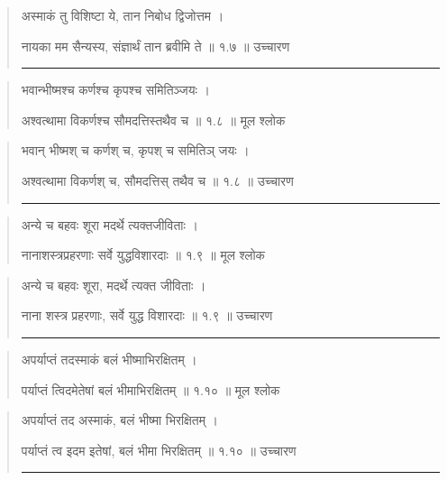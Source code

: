 \begin{quotation}

अस्माकं तु विशिष्टा ये, तान निबोध द्विजोत्तम  ।  

नायका मम सैन्यस्य, संज्ञार्थं तान ब्रवीमि ते  ॥ १.७ ॥  उच्चारण

\noindent\rule{16cm}{0.4pt} 
\end{quotation}


\begin{quotation} 

भवान्भीष्मश्च कर्णश्च कृपश्च समितिञ्जयः  ।  

अश्वत्थामा विकर्णश्च सौमदत्तिस्तथैव च  ॥ १.८ ॥  मूल श्लोक
\end{quotation}

\begin{quotation}

भवान् भीष्मश् च कर्णश् च, कृपश् च समितिञ् जयः ।  

अश्वत्थामा विकर्णश् च, सौमदत्तिस् तथैव च  ॥ १.८ ॥  उच्चारण

\noindent\rule{16cm}{0.4pt} 
\end{quotation}


\begin{quotation} 

अन्ये च बहवः शूरा मदर्थे त्यक्तजीविताः  ।  

नानाशस्त्रप्रहरणाः सर्वे युद्धविशारदाः  ॥ १.९ ॥  मूल श्लोक
\end{quotation}

\begin{quotation}

अन्ये च बहवः शूरा, मदर्थे त्यक्त जीविताः  ।  

नाना शस्त्र प्रहरणाः, सर्वे युद्ध विशारदाः  ॥ १.९ ॥  उच्चारण

\noindent\rule{16cm}{0.4pt} 
\end{quotation}


\begin{quotation} 

अपर्याप्तं तदस्माकं बलं भीष्माभिरक्षितम्‌  ।  

पर्याप्तं त्विदमेतेषां बलं भीमाभिरक्षितम्‌  ॥ १.१० ॥  मूल श्लोक
\end{quotation}

\begin{quotation}

अपर्याप्तं तद अस्माकं, बलं भीष्मा भिरक्षितम्  ।  

पर्याप्तं त्व इदम इतेषां, बलं भीमा भिरक्षितम्  ॥ १.१० ॥  उच्चारण

\noindent\rule{16cm}{0.4pt} 
\end{quotation}


